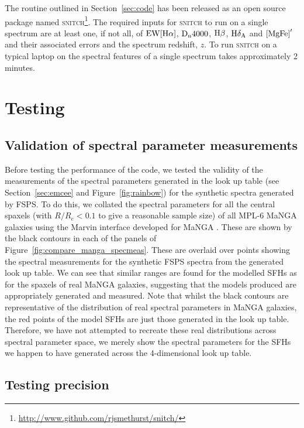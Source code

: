 \documentclass[useAMS,usenatbib]{mn2e}
\begin{document}
The routine outlined in Section~\ref{sec:code} has been released as an open source package named \textsc{snitch}\footnote{\url{http://www.github.com/rjsmethurst/snitch/}}. The required inputs for \textsc{snitch} to run on a single spectrum are at least one, if not all, of $\rm{EW}[H\alpha]$, $\rm{D}_n4000$, $\rm{H}\beta$, $\rm{H}\delta_A$ and $\rm{[MgFe]}^{\prime}$ and their associated errors and the spectrum redshift, $z$. To run \textsc{snitch} on a typical laptop on the spectral features of a single spectrum takes approximately 2 minutes. 

\section{Testing}\label{sec:test}

\subsection{Validation of spectral parameter measurements}\label{sec:precisiontest}


Before testing the performance of the code, we tested the validity of the measurements of the spectral parameters generated in the look up table (see Section~\ref{sec:emcee} and Figure~\ref{fig:rainbow}) for the synthetic spectra generated by FSPS. To do this, we collated the spectral parameters for all the central spaxels (with $R/R_e < 0.1$ to give a reasonable sample size) of all MPL-6 MaNGA galaxies using the Marvin interface developed for MaNGA \citep{cherinka18}. These are shown by the black contours in each of the panels of Figure~\ref{fig:compare_manga_specmeas}. These are overlaid over points showing the spectral measurements for the synthetic FSPS spectra from the generated look up table. We can see that similar ranges are found for the modelled SFHs as for the spaxels of real MaNGA galaxies, suggesting that the models produced are appropriately generated and measured. Note that whilst the black contours are representative of the distribution of real spectral parameters in MaNGA galaxies, the red points of the model SFHs are just those generated in the look up table. Therefore, we have not attempted to recreate these real distributions across spectral parameter space, we merely show the spectral parameters for the SFHs we happen to have generated across the 4-dimensional look up table. 




\subsection{Testing precision}\label{sec:precisiontest}
\end{document}
